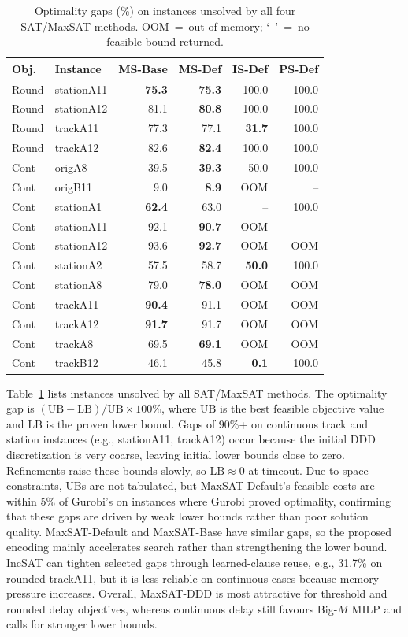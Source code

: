 \documentclass[runningheads]{llncs}
\begin{document}
\begin{table}
\centering
\caption{Optimality gaps (\%) on instances unsolved by all four SAT/MaxSAT methods. OOM~=~out-of-memory; `--'~=~no feasible bound returned.}
\label{tab:gap}
\scriptsize
\setlength{\tabcolsep}{4.5pt}
\renewcommand{\arraystretch}{1.0}
\begin{tabular}{llrrrr}
\toprule
Obj. & Instance & MS-Base & MS-Def & IS-Def & PS-Def \\
\midrule
Round & stationA11 & \textbf{75.3} & \textbf{75.3} & 100.0 & 100.0 \\
Round & stationA12 & 81.1 & \textbf{80.8} & 100.0 & 100.0 \\
Round & trackA11 & 77.3 & 77.1 & \textbf{31.7} & 100.0 \\
Round & trackA12 & 82.6 & \textbf{82.4} & 100.0 & 100.0 \\
\midrule
Cont & origA8 & 39.5 & \textbf{39.3} & 50.0 & 100.0 \\
Cont & origB11 & 9.0 & \textbf{8.9} & OOM & -- \\
Cont & stationA1 & \textbf{62.4} & 63.0 & -- & 100.0 \\
Cont & stationA11 & 92.1 & \textbf{90.7} & OOM & -- \\
Cont & stationA12 & 93.6 & \textbf{92.7} & OOM & OOM \\
Cont & stationA2 & 57.5 & 58.7 & \textbf{50.0} & 100.0 \\
Cont & stationA8 & 79.0 & \textbf{78.0} & OOM & OOM \\
Cont & trackA11 & \textbf{90.4} & 91.1 & OOM & OOM \\
Cont & trackA12 & \textbf{91.7} & 91.7 & OOM & OOM \\
Cont & trackA8 & 69.5 & \textbf{69.1} & OOM & OOM \\
Cont & trackB12 & 46.1 & 45.8 & \textbf{0.1} & 100.0 \\
\bottomrule
\end{tabular}
\end{table}

Table~\ref{tab:gap} lists instances unsolved by all SAT/MaxSAT methods. The optimality gap is $(\text{UB} - \text{LB}) / \text{UB} \times 100\%$, where $\text{UB}$ is the best feasible objective value and $\text{LB}$ is the proven lower bound. Gaps of 90\%+ on continuous track and station instances (e.g., stationA11, trackA12) occur because the initial DDD discretization is very coarse, leaving initial lower bounds close to zero. Refinements raise these bounds slowly, so $\text{LB} \approx 0$ at timeout. Due to space constraints, UBs are not tabulated, but MaxSAT-Default's feasible costs are within 5\% of Gurobi's on instances where Gurobi proved optimality, confirming that these gaps are driven by weak lower bounds rather than poor solution quality.
MaxSAT-Default and MaxSAT-Base have similar gaps, so the proposed encoding
mainly accelerates search rather than strengthening the lower bound. IncSAT can
tighten selected gaps through learned-clause reuse, e.g., 31.7\% on rounded
trackA11, but it is less reliable on continuous cases because memory pressure
increases. Overall, MaxSAT-DDD is most attractive for threshold and rounded
delay objectives, whereas continuous delay still favours Big-$M$ MILP and calls
for stronger lower bounds.
\end{document}
